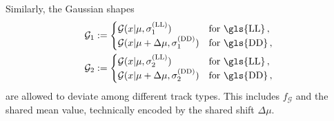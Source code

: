 Similarly, the Gaussian shapes
\begin{align*}
    \mathcal{G}_1 &:= \begin{cases}
        \mathcal{G}(x|\mu,\sigma_1^\text{(LL)}) & \text{for \gls{LL}} \,,\\
        \mathcal{G}(x|\mu + \Delta \mu,\sigma_1^\text{(DD)}) & \text{for \gls{DD}} \,,\\
    \end{cases} \\ 
    \mathcal{G}_2 &:= \begin{cases}
        \mathcal{G}(x|\mu,\sigma_2^\text{(LL)}) & \text{for \gls{LL}} \,,\\
        \mathcal{G}(x|\mu + \Delta \mu,\sigma_2^\text{(DD)}) & \text{for \gls{DD}} \,,\\
    \end{cases}
\end{align*}
are allowed to deviate among different track types.
This includes $f_\mathcal{G}$ and the shared mean value, technically encoded by the shared shift $\Delta \mu$.

